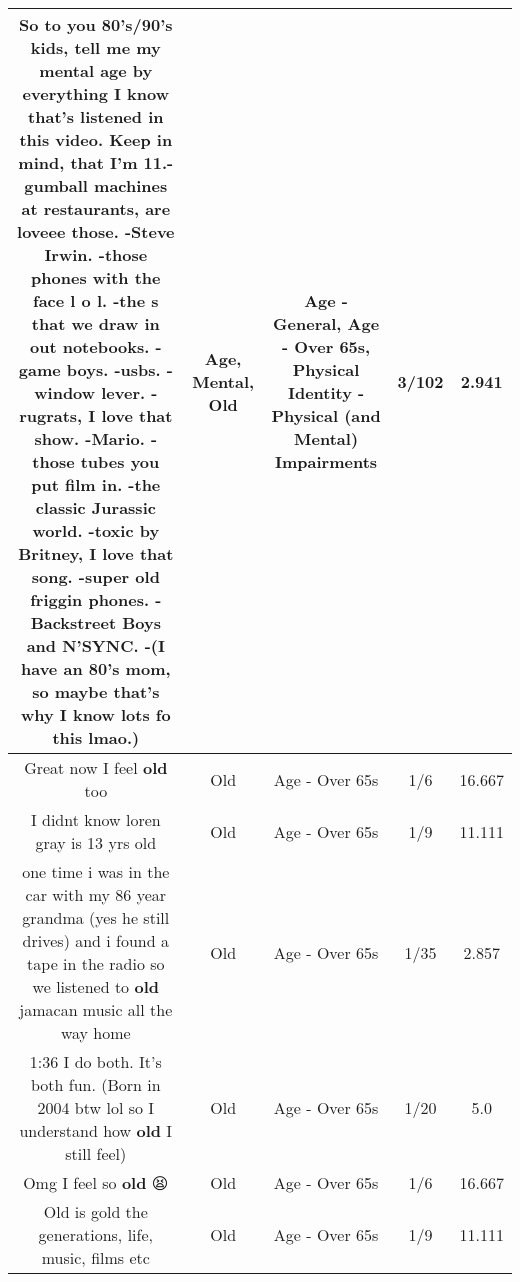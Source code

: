 \documentclass[11pt]{article}
\newlength\mylength
\begin{document}
\begin{center}
\begin{longtable}{|C{.65\mylength}|C{.30\mylength}|C{.12\mylength}|C{.12\mylength}|C{.12\mylength}|}
  \small So to you 80's/90's kids, tell me my \textbf{mental} \textbf{age} by everything I know that's listened in this video. Keep in mind, that I'm 11.-gumball machines at restaurants, are loveee those.  -Steve Irwin. -those phones with the face l o l. -the s that we draw in out notebooks. -game boys. -usbs. -window lever. -rugrats, I love that show.  -Mario. -those tubes you put film in. -the classic Jurassic world. -toxic by Britney, I love that song. -super \textbf{old} friggin phones. -Backstreet Boys and N'SYNC. -(I have an 80's mom, so maybe that's why I know lots fo this lmao.)\normalsize   & Age, Mental, Old & Age - General, Age - Over 65s, Physical Identity - Physical (and Mental) Impairments & 3/102 & 2.941 \\  \hline
  \small Great now I feel \textbf{old} too\normalsize   & Old & Age - Over 65s & 1/6 & 16.667 \\  \hline
  \small I didnt know loren gray is 13 yrs old\normalsize   & Old & Age - Over 65s & 1/9 & 11.111 \\  \hline
  \small one time i was in the car with my 86 year grandma (yes he still drives) and i found a tape in the radio so we listened to  \textbf{old} jamacan music all the way home\normalsize   & Old & Age - Over 65s & 1/35 & 2.857 \\  \hline
  \small 1:36 I do both. It's both fun. (Born in 2004 btw lol so I understand how \textbf{old} I still feel)\normalsize   & Old & Age - Over 65s & 1/20 & 5.0 \\  \hline
  \small Omg I feel so \textbf{old} 😫\normalsize   & Old & Age - Over 65s & 1/6 & 16.667 \\  \hline
  \small Old is gold the generations, life, music, films etc\normalsize   & Old & Age - Over 65s & 1/9 & 11.111 \\  \hline

\end{longtable}
\end{center}
\end{document}
